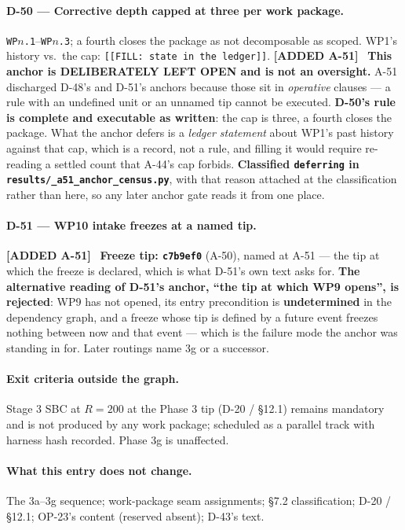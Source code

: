 \documentclass[
  10pt,
]{article}
\newcommand{\amdnew}[1]{{\color{amdcolor}\footnotesize\textbf{[ADDED #1]}}\ }
\begin{document}
\paragraph{D-50 --- Corrective depth capped at three per work package.}
\texttt{WP$n$.1}--\texttt{WP$n$.3}; a fourth closes the package as not decomposable as scoped. WP1's history vs.\ the cap: \texttt{[[FILL: state in the ledger]]}. \amdnew{A-51} \textbf{This anchor is DELIBERATELY LEFT OPEN and is not an oversight.} A-51 discharged D-48's and D-51's anchors because those sit in \emph{operative} clauses --- a rule with an undefined unit or an unnamed tip cannot be executed. \textbf{D-50's rule is complete and executable as written}: the cap is three, a fourth closes the package. What the anchor defers is a \emph{ledger statement} about WP1's past history against that cap, which is a record, not a rule, and filling it would require re-reading a settled count that A-44's cap forbids. \textbf{Classified \texttt{deferring} in \texttt{results/\allowbreak{}\_a51\_anchor\_census.py}}, with that reason attached at the classification rather than here, so any later anchor gate reads it from one place.

\paragraph{D-51 --- WP10 intake freezes at a named tip.}
\amdnew{A-51} \textbf{Freeze tip: \texttt{c7b9ef0}} (A-50), named at A-51 --- the tip at which the freeze is declared, which is what D-51's own text asks for. \textbf{The alternative reading of D-51's anchor, ``the tip at which WP9 opens'', is rejected}: WP9 has not opened, its entry precondition is \textbf{undetermined} in the dependency graph, and a freeze whose tip is defined by a future event freezes nothing between now and that event --- which is the failure mode the anchor was standing in for. Later routings name 3g or a successor.

\paragraph{Exit criteria outside the graph.}
Stage 3 SBC at $R{=}200$ at the Phase 3 tip (D-20 / §12.1) remains mandatory and is not produced by any work package; scheduled as a parallel track with harness hash recorded. Phase 3g is unaffected.

\paragraph{What this entry does not change.}
The 3a--3g sequence; work-package seam assignments; §7.2 classification; D-20 / §12.1; OP-23's content (reserved absent); D-43's text.
\end{document}
